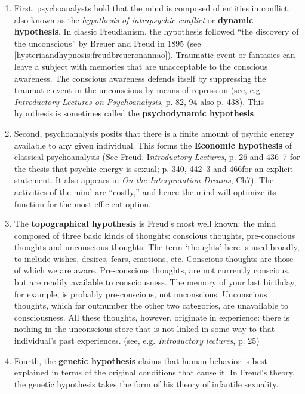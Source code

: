 \begin{enumerate}
\item First, psychoanalysts hold that the mind is composed of entities in conflict, also known as the \emph{hypothesis of intrapsychic conflict} or \textbf{dynamic hypothesis}. In classic Freudianism, the hypothesis followed ``the discovery of the unconscious'' by Breuer and Freud in 1895 (see \ref{hysteriaandhypnosis:freudbreueronannao}). Traumatic event or fantasies can leave a subject with memories that are unacceptable to the conscious awareness. The conscious awareness defends itself by suppressing the traumatic event in the unconscious by means of repression (see, e.g. \emph{Introductory Lectures on Psychoanalysis}, p. 82, 94 also p. 438). This hypothesis is sometimes called the \textbf{psychodynamic hypothesis}.

\item Second, psychoanalysis posits that there is a finite amount of psychic energy available to any given individual. This forms the \textbf{Economic hypothesis} of classical psychoanalysis (See Freud, I\emph{ntroductory Lectures}, p. 26 and 436--7 for the thesis that psychic energy is sexual; p. 340, 442--3 and 466for an explicit statement. It also appears in \emph{On the Interpretation Dreams}, Ch7). The activities of the mind are ``costly,'' and hence the mind will optimize its function for the most efficient option.

\item The \textbf{topographical hypothesis} is Freud's most well known: the mind composed of three basic kinds of thoughts: conscious thoughts, pre-conscious thoughts and unconscious thoughts. The term `thoughts' here is used broadly, to include wishes, desires, fears, emotions, etc. Conscious thoughts are those of which we are aware. Pre-conscious thoughts, are not currently conscious, but are readily available to consciousness. The memory of your last birthday, for example, is probably pre-conscious, not unconscious. Unconscious thoughts, which far outnumber the other two categories, are unavailable to consciousness. All these thoughts, however, originate in experience: there is nothing in the unconscious store that is not linked in some way to that individual's past experiences. (see, e.g. \emph{Introductory lectures}, p. 25)

\item Fourth, the \textbf{genetic hypothesis} claims that human behavior is best explained in terms of the original conditions that cause it. In Freud's theory, the genetic hypothesis takes the form of his theory of infantile sexuality.

\end{enumerate}

